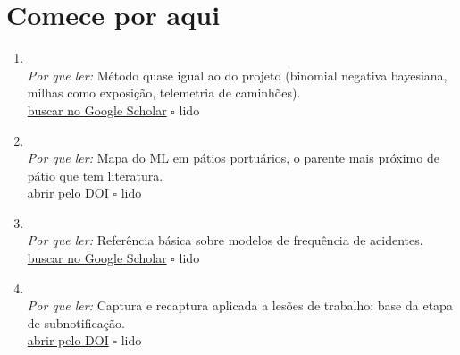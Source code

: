 \section{Comece por aqui}
\begin{enumerate}[leftmargin=*]
  \item {}\\
  \textit{Por que ler:} Método quase igual ao do projeto (binomial negativa bayesiana, milhas como exposição, telemetria de caminhões).\\
  \href{https://scholar.google.com/scholar?q=The+association+between+crashes+and+safety-critical+events\%3A+synthesized+evidence+from+crash+reports+and+naturalistic+driving+data+among+commercial+truck+drivers}{buscar no Google Scholar} \hfill $\square$ \textsf{\small lido}
  \item {}\\
  \textit{Por que ler:} Mapa do ML em pátios portuários, o parente mais próximo de pátio que tem literatura.\\
  \href{https://doi.org/10.1016/j.tre.2022.102722}{abrir pelo DOI} \hfill $\square$ \textsf{\small lido}
  \item {}\\
  \textit{Por que ler:} Referência básica sobre modelos de frequência de acidentes.\\
  \href{https://scholar.google.com/scholar?q=The+statistical+analysis+of+crash-frequency+data\%3A+a+review+and+assessment+of+methodological+alternatives}{buscar no Google Scholar} \hfill $\square$ \textsf{\small lido}
  \item {}\\
  \textit{Por que ler:} Captura e recaptura aplicada a lesões de trabalho: base da etapa de subnotificação.\\
  \href{https://doi.org/10.1097/01.jom.0000205864.81970.63}{abrir pelo DOI} \hfill $\square$ \textsf{\small lido}
\end{enumerate}

